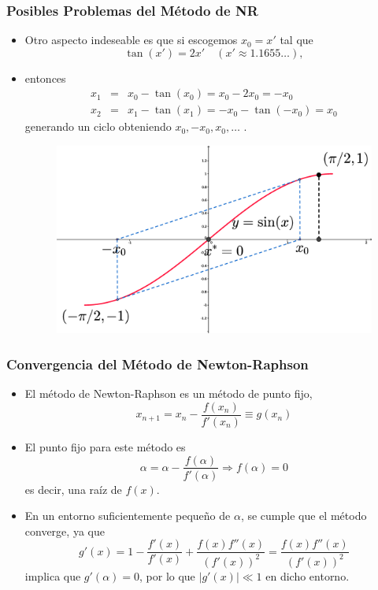 \documentclass{beamer}
\begin{document}
\begin{frame}
  \frametitle{Posibles Problemas del M\'etodo de NR}
  \begin{itemize}
    \item<1-> Otro aspecto indeseable es que si escogemos $x_0 = x'$ tal que
    $$
    \tan(x') = 2x' \quad(x' \approx 1.1655\ldots),
    $$
    \item<2->entonces
    \begin{eqnarray}
    \nonumber x_1 & = & x_0 - \tan(x_0) = x_0 - 2x_0 = -x_0\\
    \nonumber x_2 & = & x_1 - \tan(x_1) = -x_0 - \tan(-x_0 ) = x_0
    \end{eqnarray}
    generando un ciclo obteniendo $x_0 , -x_0 , x_0 ,\ldots$ .    
    \begin{figure}[ht]
    \begin{center}
      \includegraphics[scale=0.15]{./curva_newton_p2.eps}
    \end{center}
    \end{figure}    
  \end{itemize}
\end{frame}    
\begin{frame}
  \frametitle{Convergencia del M\'etodo de Newton-Raphson}
  \begin{itemize}
    \item<1-> El m\'etodo de Newton-Raphson es un m\'etodo de punto fijo,
    $$
    x_{n+1} = x_n - \frac{f(x_n)}{f'(x_n)} \equiv g(x_n)
    $$
    \item<2->El punto fijo para este m\'etodo es
    $$
    \alpha = \alpha - \frac{f(\alpha)}{f'(\alpha)} \Rightarrow f(\alpha)=0
    $$    
    es decir, una ra\'iz de $f(x)$.
    \item<3->En un entorno suficientemente peque\~no de $\alpha$, se cumple
    que el m\'etodo converge, ya que
    $$
    g'(x) = 1- \frac{f'(x)}{f'(x)} + \frac{f(x)f''(x)}{(f'(x))^2} = \frac{f(x)f''(x)}{(f'(x))^2}
    $$    
    implica que $g'(\alpha) = 0$, por lo que $|g'(x)| \ll 1$ en dicho entorno.
  \end{itemize}    
\end{frame}
\end{document}
